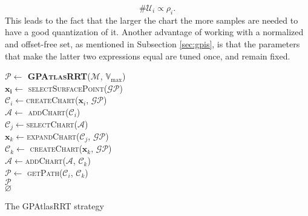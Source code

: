 \begin{equation}
\#\mathcal{U}_i \propto \rho_i.
\end{equation}
This leads to the fact that the larger the chart the more samples are needed to have a good quantization of it.
Another advantage of working with a normalized and offset-free set, as mentioned in Subsection \ref{sec:gpis}, is that the parameters that make the latter two expressions equal are tuned once, and remain fixed.

\begin{algorithm}[t]
    \textbf{$\mathcal{P} \leftarrow$ \textsc{GPAtlasRRT}}($\mathcal{M}$, $\mathbb{V}_{\max}$)\\ %
\LinesNumbered
\DontPrintSemicolon
\SetAlgoVlined {} 
$\mathbf{x_i} \leftarrow$ \textsc{selectSurfacePoint}($\mathcal{GP}$) \label{init} \\ 
$\mathcal{C}_{i} \leftarrow$\textsc{createChart}($\mathbf{x}_i$, $\mathcal{GP}$) \label{create_chart} \\
$\mathcal{A} \leftarrow$ \textsc{addChart}($\mathcal{C}_i$) \label{add_chart} \\
  \label{is_expandable} 
  {
    $\mathcal{C}_j \leftarrow$\textsc{selectChart}($\mathcal{A}$) \label{select_chart} \\
    $\mathbf{x}_k \leftarrow$\textsc{expandChart}($\mathcal{C}_j$, $\mathcal{GP}$) \label{expand_chart} \\
    $\mathcal{C}_k \leftarrow$ \textsc{createChart}($\mathbf{x}_k$, $\mathcal{GP}$) \label{create_new_chart} \\
    $\mathcal{A} \leftarrow$\textsc{addChart}($\mathcal{A}$, $\mathcal{C}_k$) \label{add_new_chart} \\
    \label{ending} 
    {
      $\mathcal{P} \leftarrow$ \textsc{getPath}($\mathcal{C}_i$, $\mathcal{C}_k$) \label{compute_path} \\
      \Return $\mathcal{P}$ \label{return_path} \\
    }
  }
  \Return $\varnothing$ \label{no_candidate}
  \caption{The GPAtlasRRT strategy} \label{alg:strategy}
\end{algorithm}


